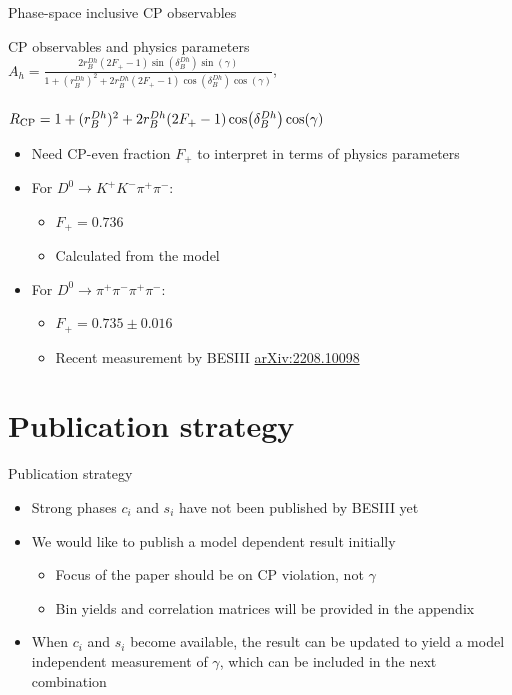 \documentclass{beamer}
\begin{document}
\begin{frame}{Phase-space inclusive CP observables}
  \begin{block}{CP observables and physics parameters}
    $A_h = \frac{2r_B^{Dh}(2F_+ - 1)\sin(\delta_B^{Dh})\sin(\gamma)}{1 + (r_B^{Dh})^2 + 2r_B^{Dh}(2F_+ - 1)\cos(\delta_B^{Dh})\cos(\gamma)}$, \\~\\
    $R_{\rm CP} = 1 + (r_B^{Dh})^2 + 2r_B^{Dh}(2F_+ - 1)\cos(\delta_B^{Dh})\cos(\gamma)$
  \end{block}
  \vspace{0.3cm}
  \begin{itemize}
    \setlength\itemsep{0.5em}
    \item{Need CP-even fraction $F_+$ to interpret in terms of physics parameters}
    \item{For $D^0\to K^+K^-\pi^+\pi^-$:}
    \begin{itemize}
      \item{$F_+ = 0.736$}
      \item{Calculated from the model}
    \end{itemize}
    \item{For $D^0\to\pi^+\pi^-\pi^+\pi^-$:}
    \begin{itemize}
      \item{$F_+ = 0.735 \pm 0.016$}
      \item{Recent measurement by BESIII \href{https://arxiv.org/abs/2208.10098}{arXiv:2208.10098}}
    \end{itemize}
  \end{itemize}
\end{frame}

\section{Publication strategy}

\begin{frame}{Publication strategy}
  \begin{itemize}
    \setlength\itemsep{2.0em}
    \item{Strong phases $c_i$ and $s_i$ have not been published by BESIII yet}
    \item{We would like to publish a model dependent result initially}
    \begin{itemize}
      \item{Focus of the paper should be on CP violation, not $\gamma$}
      \item{Bin yields and correlation matrices will be provided in the appendix}
    \end{itemize}
    \item{When $c_i$ and $s_i$ become available, the result can be updated to yield a model independent measurement of $\gamma$, which can be included in the next combination}
  \end{itemize}
\end{frame}
\end{document}
